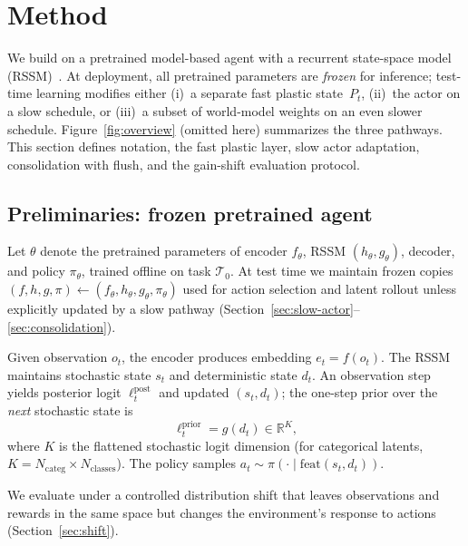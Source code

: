 
\section{Method}
\label{sec:method}

We build on a pretrained model-based agent with a recurrent state-space model (RSSM)~\cite{hafner2020dream}.
At deployment, all pretrained parameters are \emph{frozen} for inference; test-time learning modifies either (i)~a separate fast plastic state~$P_t$, (ii)~the actor on a slow schedule, or (iii)~a subset of world-model weights on an even slower schedule.
Figure~\ref{fig:overview} (omitted here) summarizes the three pathways.
This section defines notation, the fast plastic layer, slow actor adaptation, consolidation with flush, and the gain-shift evaluation protocol.

\subsection{Preliminaries: frozen pretrained agent}
\label{sec:prelim}

Let $\theta$ denote the pretrained parameters of encoder $f_\theta$, RSSM $(h_\theta, g_\theta)$, decoder, and policy $\pi_\theta$, trained offline on task $\mathcal{T}_0$.
At test time we maintain frozen copies $(f, h, g, \pi) \leftarrow (f_\theta, h_\theta, g_\theta, \pi_\theta)$ used for action selection and latent rollout unless explicitly updated by a slow pathway (Section~\ref{sec:slow-actor}--\ref{sec:consolidation}).

Given observation $o_t$, the encoder produces embedding $e_t = f(o_t)$.
The RSSM maintains stochastic state $s_t$ and deterministic state $d_t$.
An observation step yields posterior logit $\ell^{\mathrm{post}}_t$ and updated $(s_t, d_t)$; the one-step prior over the \emph{next} stochastic state is
\begin{equation}
  \ell^{\mathrm{prior}}_t = g(d_t) \in \mathbb{R}^{K},
\end{equation}
where $K$ is the flattened stochastic logit dimension (for categorical latents, $K = N_{\mathrm{categ}} \times N_{\mathrm{classes}}$).
The policy samples $a_t \sim \pi(\cdot \mid \mathrm{feat}(s_t, d_t))$.

We evaluate under a controlled distribution shift that leaves observations and rewards in the same space but changes the environment's response to actions (Section~\ref{sec:shift}).

